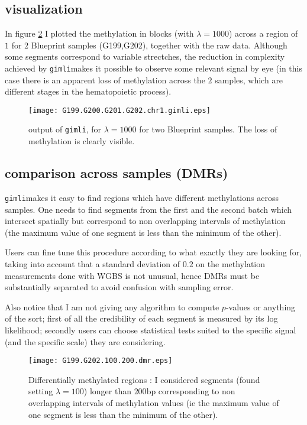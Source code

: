 \documentclass[12pt]{amsart}
\newcommand{\gimli}{\texttt{gimli}}
\begin{document}
\subsection{visualization}

In figure \ref{ex1} I plotted the methylation in blocks (with $\lambda=1000$) 
across a region of $1$ for $2$ Blueprint samples
(G199,G202), together with the raw data.  Although some segments
correspond to variable strectches, the reduction in complexity achieved by \gimli makes it 
possible to observe some relevant signal by eye (in this case there is 
an apparent loss of methylation across the $2$ samples, which are different 
stages in the hematopoietic process).

\begin{figure}\label{ex1}
\texttt{[image: G199.G200.G201.G202.chr1.gimli.eps]}
\caption{output of \gimli, for $\lambda=1000$ for two Blueprint samples. The loss of
methylation is clearly visible.}
\end{figure}

\subsection{comparison across samples (DMRs)}

\gimli  makes it easy to find regions which have different 
methylations across samples. One needs to find segments 
from the first and the second batch which intersect spatially
but correspond to non overlapping intervals of methylation 
(the maximum value of one 
segment is less than the minimum of the other).

Users can fine tune this procedure according to what exactly they 
are looking for, taking into account that a standard deviation of $0.2$
on the methylation measurements done with WGBS is not unusual, hence
DMRs must be substantially separated to avoid confusion with sampling error.

Also notice that I am not giving any algorithm to compute $p$-values
or anything of the sort; first of all the credibility of each segment
is measured by its log likelihood; secondly users can choose statistical
tests suited to the specific signal (and the specific scale)
they are considering.

\begin{figure}\label{ex1}
\texttt{[image: G199.G202.100.200.dmr.eps]}
\caption{Differentially methylated regions : I considered segments 
(found setting $\lambda=100$) longer than $200$bp 
corresponding to
non overlapping intervals of methylation values (ie the maximum value of one 
segment is less than the minimum of the other).}
\end{figure}
\end{document}
